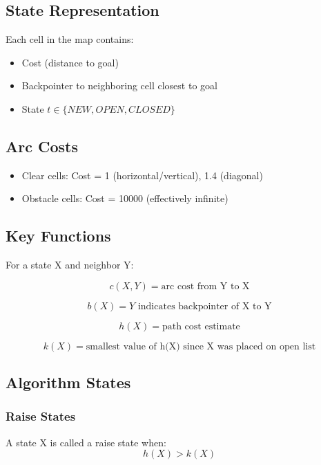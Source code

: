 \documentclass[openany]{book}
\theoremstyle{definition}
\theoremstyle{remark}
\begin{document}
\subsection{State Representation}
Each cell in the map contains:
\begin{itemize}
    \item Cost (distance to goal)
    \item Backpointer to neighboring cell closest to goal
    \item State $t \in \{NEW, OPEN, CLOSED\}$
\end{itemize}

\subsection{Arc Costs}
\begin{itemize}
    \item Clear cells: Cost = 1 (horizontal/vertical), 1.4 (diagonal)
    \item Obstacle cells: Cost = 10000 (effectively infinite)
\end{itemize}

\subsection{Key Functions}
For a state X and neighbor Y:

\begin{equation}
c(X,Y) = \text{arc cost from Y to X}
\end{equation}

\begin{equation}
b(X) = Y \text{ indicates backpointer of X to Y}
\end{equation}

\begin{equation}
h(X) = \text{path cost estimate}
\end{equation}

\begin{equation}
k(X) = \text{smallest value of h(X) since X was placed on open list}
\end{equation}

\subsection{Algorithm States}
\subsubsection{Raise States}
A state X is called a raise state when:
\begin{equation}
h(X) > k(X)
\end{equation}
\end{document}
